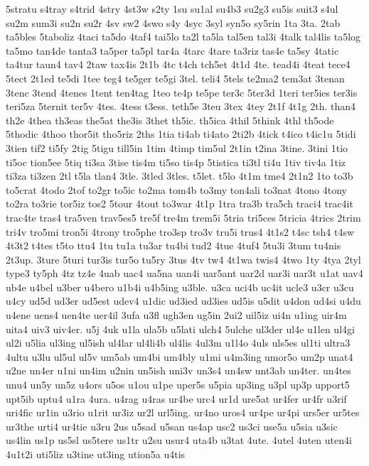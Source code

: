 {5stratu
s4tray
s4trid
4stry
4st3w
s2ty
1su
su1al
su4b3
su2g3
su5is
suit3
s4ul
su2m
sum3i
su2n
su2r
4sv
sw2
4swo
s4y
4syc
3syl
syn5o
sy5rin
1ta
3ta.
2tab
ta5bles
5taboliz
4taci
ta5do
4taf4
tai5lo
ta2l
ta5la
tal5en
tal3i
4talk
tal4lis
ta5log
ta5mo
tan4de
tanta3
ta5per
ta5pl
tar4a
4tarc
4tare
ta3riz
tas4e
ta5sy
4tatic
ta4tur
taun4
tav4
2taw
tax4is
2t1b
4tc
t4ch
tch5et
4t1d
4te.
tead4i
4teat
tece4
5tect
2t1ed
te5di
1tee
teg4
te5ger
te5gi
3tel.
teli4
5tels
te2ma2
tem3at
3tenan
3tenc
3tend
4tenes
1tent
ten4tag
1teo
te4p
te5pe
ter3c
5ter3d
1teri
ter5ies
ter3is
teri5za
5ternit
ter5v
4tes.
4tess
t3ess.
teth5e
3teu
3tex
4tey
2t1f
4t1g
2th.
than4
th2e
4thea
th3eas
the5at
the3is
3thet
th5ic.
th5ica
4thil
5think
4thl
th5ode
5thodic
4thoo
thor5it
tho5riz
2ths
1tia
ti4ab
ti4ato
2ti2b
4tick
t4ico
t4ic1u
5tidi
3tien
tif2
ti5fy
2tig
5tigu
till5in
1tim
4timp
tim5ul
2t1in
t2ina
3tine.
3tini
1tio
ti5oc
tion5ee
5tiq
ti3sa
3tise
tis4m
ti5so
tis4p
5tistica
ti3tl
ti4u
1tiv
tiv4a
1tiz
ti3za
ti3zen
2tl
t5la
tlan4
3tle.
3tled
3tles.
t5let.
t5lo
4t1m
tme4
2t1n2
1to
to3b
to5crat
4todo
2tof
to2gr
to5ic
to2ma
tom4b
to3my
ton4ali
to3nat
4tono
4tony
to2ra
to3rie
tor5iz
tos2
5tour
4tout
to3war
4t1p
1tra
tra3b
tra5ch
traci4
trac4it
trac4te
tras4
tra5ven
trav5es5
tre5f
tre4m
trem5i
5tria
tri5ces
5tricia
4trics
2trim
tri4v
tro5mi
tron5i
4trony
tro5phe
tro3sp
tro3v
tru5i
trus4
4t1s2
t4sc
tsh4
t4sw
4t3t2
t4tes
t5to
ttu4
1tu
tu1a
tu3ar
tu4bi
tud2
4tue
4tuf4
5tu3i
3tum
tu4nis
2t3up.
3ture
5turi
tur3is
tur5o
tu5ry
3tus
4tv
tw4
4t1wa
twis4
4two
1ty
4tya
2tyl
type3
ty5ph
4tz
tz4e
4uab
uac4
ua5na
uan4i
uar5ant
uar2d
uar3i
uar3t
u1at
uav4
ub4e
u4bel
u3ber
u4bero
u1b4i
u4b5ing
u3ble.
u3ca
uci4b
uc4it
ucle3
u3cr
u3cu
u4cy
ud5d
ud3er
ud5est
udev4
u1dic
ud3ied
ud3ies
ud5is
u5dit
u4don
ud4si
u4du
u4ene
uens4
uen4te
uer4il
3ufa
u3fl
ugh3en
ug5in
2ui2
uil5iz
ui4n
u1ing
uir4m
uita4
uiv3
uiv4er.
u5j
4uk
u1la
ula5b
u5lati
ulch4
5ulche
ul3der
ul4e
u1len
ul4gi
ul2i
u5lia
ul3ing
ul5ish
ul4lar
ul4li4b
ul4lis
4ul3m
u1l4o
4uls
uls5es
ul1ti
ultra3
4ultu
u3lu
ul5ul
ul5v
um5ab
um4bi
um4bly
u1mi
u4m3ing
umor5o
um2p
unat4
u2ne
un4er
u1ni
un4im
u2nin
un5ish
uni3v
un3s4
un4sw
unt3ab
un4ter.
un4tes
unu4
un5y
un5z
u4ors
u5os
u1ou
u1pe
uper5s
u5pia
up3ing
u3pl
up3p
upport5
upt5ib
uptu4
u1ra
4ura.
u4rag
u4ras
ur4be
urc4
ur1d
ure5at
ur4fer
ur4fr
u3rif
uri4fic
ur1in
u3rio
u1rit
ur3iz
ur2l
url5ing.
ur4no
uros4
ur4pe
ur4pi
urs5er
ur5tes
ur3the
urti4
ur4tie
u3ru
2us
u5sad
u5san
us4ap
usc2
us3ci
use5a
u5sia
u3sic
us4lin
us1p
us5sl
us5tere
us1tr
u2su
usur4
uta4b
u3tat
4ute.
4utel
4uten
uten4i
4u1t2i
uti5liz
u3tine
ut3ing
ution5a
u4tis
}
